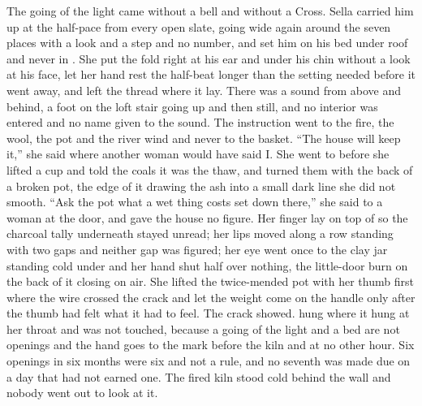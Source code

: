 The going of the light came without a bell and without a Cross. Sella carried him up at the half-pace from every open slate, going wide again around the seven places with a look and a step and no number, and set him on his bed under  roof and never in . She put the fold right at his ear and under his chin without a look at his face, let her hand rest the half-beat longer than the setting needed before it went away, and left the thread where it lay. There was a sound from above and behind, a foot on the loft stair going up and then still, and no interior was entered and no name given to the sound. The instruction went to the fire, the wool, the pot and the river wind and never to the basket. “The house will keep it,” she said where another woman would have said I. She went to  before she lifted a cup and told the coals it was the thaw, and turned them with the back of a broken pot, the edge of it drawing the ash into a small dark line she did not smooth. “Ask the pot what a wet thing costs set down there,” she said to a woman at the door, and gave the house no figure. Her finger lay on top of  so the charcoal tally underneath stayed unread; her lips moved along a row standing with two gaps and neither gap was figured; her eye went once to the clay jar standing cold under  and her hand shut half over nothing, the little-door burn on the back of it closing on air. She lifted the twice-mended pot with her thumb first where the wire crossed the crack and let the weight come on the handle only after the thumb had felt what it had to feel. The crack showed.  hung where it hung at her throat and was not touched, because a going of the light and a bed are not openings and the hand goes to the mark before the kiln and at no other hour. Six openings in six months were six and not a rule, and no seventh was made due on a day that had not earned one. The fired kiln stood cold behind the wall and nobody went out to look at it.

